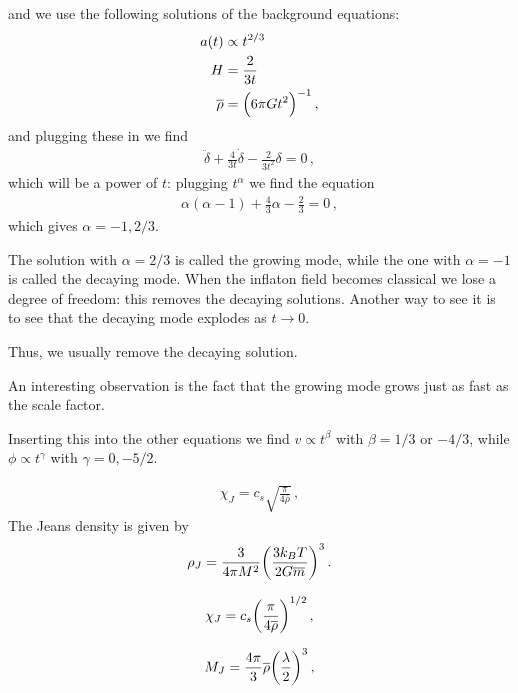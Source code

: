 \documentclass[main.tex]{subfiles}
\begin{document}
and we use the following solutions of the background equations: 
%
\begin{align}
  a(t ) &\propto t^{2/3}  \\
  H &= \frac{2}{3t}  \\
\overline{\rho} &= \qty(6 \pi G t^2)^{-1}
\,,
\end{align}
%
and plugging these in we find 
%
\begin{align}
  \ddot{\delta} + \frac{4}{3t} \dot{\delta} - \frac{2}{3t^2} \delta = 0
\,,
\end{align}
%
which will be a power of \(t\): plugging \(t^{\alpha }\) we find the equation 
%
\begin{align}
  \alpha (\alpha -1) + \frac{4}{3} \alpha - \frac{2}{3} =0 
\,,
\end{align}
%
which gives \(\alpha = -1, 2/3\). 

The solution with \(\alpha = 2/3\) is called the growing mode, while the one with \(\alpha = -1\) is called the decaying mode. 
When the inflaton field becomes classical we lose a degree of freedom: this removes the decaying solutions. 
Another way to see it is to see that the decaying mode explodes as \(t \rightarrow 0\). 

Thus, we usually remove the decaying solution. 

An interesting observation is the fact that the growing mode grows just as fast as the scale factor. 

Inserting this into the other equations we find \(v \propto t^{\beta } \) with \(\beta = 1/3\) or \(-4/3\), while \(\phi \propto t^{\gamma }\) with \(\gamma = 0, -5/2\). 

%
\begin{align}
    \chi_{J} = c_s \sqrt{\frac{\pi}{4 \overline{\rho}}}
  \,,
  \end{align}
%
The Jeans density is given by 
%
\begin{align}
  \rho_{J} = \frac{3}{4 \pi M^2} \qty(\frac{3k_B T}{2G \overline{m}})^{3}
\,.
\end{align}
%

%
\begin{align}
  \chi_J = c_s \qty(\frac{\pi}{4 \overline{\rho}})^{1/2}
\,,
\end{align}
%

%
\begin{align}
  M_J = \frac{4 \pi }{3} \overline{\rho} \qty(\frac{\lambda}{2})^{3}
\,,
\end{align}
%
\end{document}
